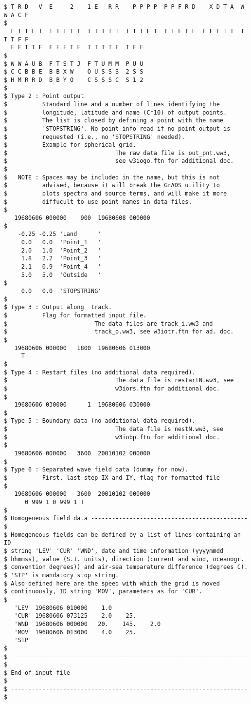 \begin{verbatim}
$ T R D   V  E     2    1 E   R R    P P P P  P P F R D    X D T A  W W A C F 
$
  F T T F T  T T T T T  T T T T T  T T T F T  T T F T F  F F F T T  T T T F F  
  F F T T F  F F F T F  T T T T F  T F F 
$
$ W W A U B  F T S T J  F T U M M  P U U
$ C C B B E  B B X W    O U S S S  2 S S
$ H M R R D  B B Y O    C S S S C  S 1 2
$
$ Type 2 : Point output
$          Standard line and a number of lines identifying the 
$          longitude, latitude and name (C*10) of output points.
$          The list is closed by defining a point with the name
$          'STOPSTRING'. No point info read if no point output is
$          requested (i.e., no 'STOPSTRING' needed).
$          Example for spherical grid.
$                               The raw data file is out_pnt.ww3, 
$                               see w3iogo.ftn for additional doc.
$
$   NOTE : Spaces may be included in the name, but this is not
$          advised, because it will break the GrADS utility to 
$          plots spectra and source terms, and will make it more
$          diffucult to use point names in data files.
$
   19680606 000000    900  19680608 000000
$
    -0.25 -0.25 'Land      '
     0.0   0.0  'Point_1   '
     2.0   1.0  'Point_2   '
     1.8   2.2  'Point_3   '
     2.1   0.9  'Point_4   '
     5.0   5.0  'Outside   '
$
     0.0   0.0  'STOPSTRING'
$
$ Type 3 : Output along  track.
$          Flag for formatted input file.
$                         The data files are track_i.ww3 and
$                         track_o.ww3, see w3iotr.ftn for ad. doc.
$
   19680606 000000   1800  19680606 013000
     T
$
$ Type 4 : Restart files (no additional data required).
$                               The data file is restartN.ww3, see
$                               w3iors.ftn for additional doc.
$
   19680606 030000      1  19680606 030000
$
$ Type 5 : Boundary data (no additional data required).
$                               The data file is nestN.ww3, see
$                               w3iobp.ftn for additional doc.
$
   19680606 000000   3600  20010102 000000
$
$ Type 6 : Separated wave field data (dummy for now).
$          First, last step IX and IY, flag for formatted file
$
   19680606 000000   3600  20010102 000000
      0 999 1 0 999 1 T
$
$ Homogeneous field data --------------------------------------------- $
$ Homogeneous fields can be defined by a list of lines containing an ID
$ string 'LEV' 'CUR' 'WND', date and time information (yyyymmdd
$ hhmmss), value (S.I. units), direction (current and wind, oceanogr.
$ convention degrees)) and air-sea temparature difference (degrees C).
$ 'STP' is mandatory stop string.
$ Also defined here are the speed with which the grid is moved
$ continuously, ID string 'MOV', parameters as for 'CUR'.
$
   'LEV' 19680606 010000    1.0
   'CUR' 19680606 073125    2.0    25.
   'WND' 19680606 000000   20.    145.    2.0
   'MOV' 19680606 013000    4.0    25.
   'STP'
$
$ -------------------------------------------------------------------- $
$ End of input file                                                    $
$ -------------------------------------------------------------------- $
\end{verbatim}
